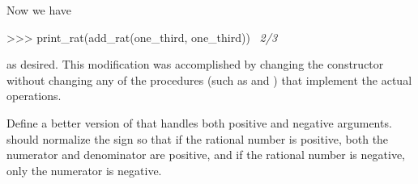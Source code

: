 \noindent
Now we have

\begin{codeBlock}
>>> print_rat(add_rat(one_third, one_third))
~\textit{2/3}~
\end{codeBlock}

\noindent
as desired.  This modification was accomplished by changing the constructor
 without changing any of the procedures (such as 
and ) that implement the actual operations.

\begin{exerciseGroup}
\label{Exercise 2.1}
 Define a better version of
 that handles both positive and negative arguments.
 should normalize the sign so that if the rational number is
positive, both the numerator and denominator are positive, and if the rational
number is negative, only the numerator is negative.
\end{exerciseGroup}

